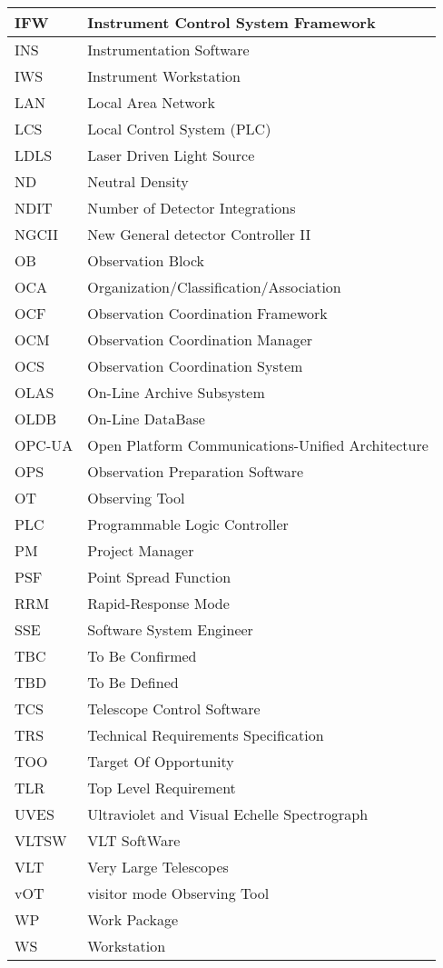\begin{longtable}{ |l|l| }
IFW & Instrument Control System Framework \\ \hline
INS & Instrumentation Software \\ \hline
IWS & Instrument Workstation \\ \hline
LAN & Local Area Network \\ \hline
LCS & Local Control System (PLC) \\ \hline
LDLS & Laser Driven Light Source \\ \hline
ND & Neutral Density \\ \hline
NDIT & Number of Detector Integrations \\ \hline
NGCII & New General detector Controller II \\ \hline
OB & Observation Block \\ \hline
OCA & Organization/Classification/Association \\ \hline
OCF & Observation Coordination Framework \\ \hline
OCM & Observation Coordination Manager \\ \hline
OCS & Observation Coordination System \\ \hline
OLAS & On-Line Archive Subsystem \\ \hline
OLDB & On-Line DataBase \\ \hline
OPC-UA & Open Platform Communications-Unified Architecture \\ \hline
OPS & Observation Preparation Software \\ \hline
OT & Observing Tool \\ \hline
PLC & Programmable Logic Controller \\ \hline
PM & Project Manager \\ \hline
PSF & Point Spread Function \\ \hline
RRM & Rapid-Response Mode \\ \hline
SSE & Software System Engineer \\ \hline
TBC & To Be Confirmed \\ \hline
TBD & To Be Defined \\ \hline
TCS & Telescope Control Software \\ \hline
TRS & Technical Requirements Specification \\ \hline
TOO & Target Of Opportunity \\ \hline
TLR & Top Level Requirement \\ \hline
UVES & Ultraviolet and Visual Echelle Spectrograph \\ \hline
VLTSW & VLT SoftWare \\ \hline
VLT & Very Large Telescopes \\ \hline
vOT & visitor mode Observing Tool \\ \hline
WP & Work Package \\ \hline
WS & Workstation \\ \hline
\end{longtable}
